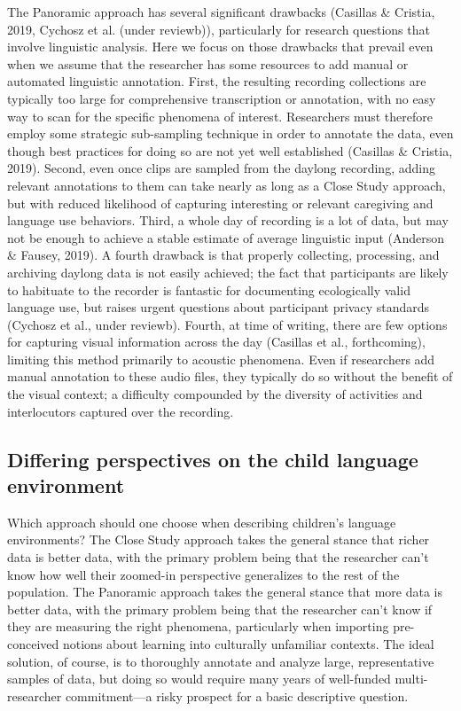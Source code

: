 \documentclass[,man,floatsintext]{apa6}
\begin{document}
The Panoramic approach has several significant drawbacks (Casillas \&
Cristia, 2019, Cychosz et al. (under reviewb)), particularly for
research questions that involve linguistic analysis. Here we focus on
those drawbacks that prevail even when we assume that the researcher has
some resources to add manual or automated linguistic annotation. First,
the resulting recording collections are typically too large for
comprehensive transcription or annotation, with no easy way to scan for
the specific phenomena of interest. Researchers must therefore employ
some strategic sub-sampling technique in order to annotate the data,
even though best practices for doing so are not yet well established
(Casillas \& Cristia, 2019). Second, even once clips are sampled from
the daylong recording, adding relevant annotations to them can take
nearly as long as a Close Study approach, but with reduced likelihood of
capturing interesting or relevant caregiving and language use behaviors.
Third, a whole day of recording is a lot of data, but may not be enough
to achieve a stable estimate of average linguistic input (Anderson \&
Fausey, 2019). A fourth drawback is that properly collecting,
processing, and archiving daylong data is not easily achieved; the fact
that participants are likely to habituate to the recorder is fantastic
for documenting ecologically valid language use, but raises urgent
questions about participant privacy standards (Cychosz et al., under
reviewb). Fourth, at time of writing, there are few options for
capturing visual information across the day (Casillas et al.,
forthcoming), limiting this method primarily to acoustic phenomena. Even
if researchers add manual annotation to these audio files, they
typically do so without the benefit of the visual context; a difficulty
compounded by the diversity of activities and interlocutors captured
over the recording.

\subsection{Differing perspectives on the child language
environment}\label{differing-perspectives-on-the-child-language-environment}

Which approach should one choose when describing children's language
environments? The Close Study approach takes the general stance that
richer data is better data, with the primary problem being that the
researcher can't know how well their zoomed-in perspective generalizes
to the rest of the population. The Panoramic approach takes the general
stance that more data is better data, with the primary problem being
that the researcher can't know if they are measuring the right
phenomena, particularly when importing pre-conceived notions about
learning into culturally unfamiliar contexts. The ideal solution, of
course, is to thoroughly annotate and analyze large, representative
samples of data, but doing so would require many years of well-funded
multi-researcher commitment---a risky prospect for a basic descriptive
question.
\end{document}
